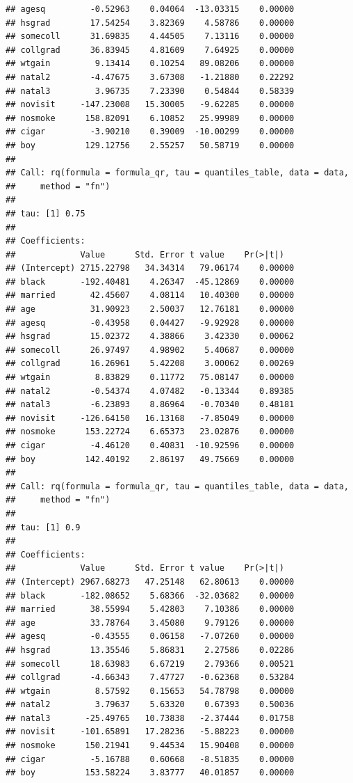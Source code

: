 \documentclass[]{book}
\begin{document}
\begin{verbatim}
## agesq         -0.52963    0.04064  -13.03315    0.00000
## hsgrad        17.54254    3.82369    4.58786    0.00000
## somecoll      31.69835    4.44505    7.13116    0.00000
## collgrad      36.83945    4.81609    7.64925    0.00000
## wtgain         9.13414    0.10254   89.08206    0.00000
## natal2        -4.47675    3.67308   -1.21880    0.22292
## natal3         3.96735    7.23390    0.54844    0.58339
## novisit     -147.23008   15.30005   -9.62285    0.00000
## nosmoke      158.82091    6.10852   25.99989    0.00000
## cigar         -3.90210    0.39009  -10.00299    0.00000
## boy          129.12756    2.55257   50.58719    0.00000
##
## Call: rq(formula = formula_qr, tau = quantiles_table, data = data,
##     method = "fn")
##
## tau: [1] 0.75
##
## Coefficients:
##             Value      Std. Error t value    Pr(>|t|)
## (Intercept) 2715.22798   34.34314   79.06174    0.00000
## black       -192.40481    4.26347  -45.12869    0.00000
## married       42.45607    4.08114   10.40300    0.00000
## age           31.90923    2.50037   12.76181    0.00000
## agesq         -0.43958    0.04427   -9.92928    0.00000
## hsgrad        15.02372    4.38866    3.42330    0.00062
## somecoll      26.97497    4.98902    5.40687    0.00000
## collgrad      16.26961    5.42208    3.00062    0.00269
## wtgain         8.83829    0.11772   75.08147    0.00000
## natal2        -0.54374    4.07482   -0.13344    0.89385
## natal3        -6.23893    8.86964   -0.70340    0.48181
## novisit     -126.64150   16.13168   -7.85049    0.00000
## nosmoke      153.22724    6.65373   23.02876    0.00000
## cigar         -4.46120    0.40831  -10.92596    0.00000
## boy          142.40192    2.86197   49.75669    0.00000
##
## Call: rq(formula = formula_qr, tau = quantiles_table, data = data,
##     method = "fn")
##
## tau: [1] 0.9
##
## Coefficients:
##             Value      Std. Error t value    Pr(>|t|)
## (Intercept) 2967.68273   47.25148   62.80613    0.00000
## black       -182.08652    5.68366  -32.03682    0.00000
## married       38.55994    5.42803    7.10386    0.00000
## age           33.78764    3.45080    9.79126    0.00000
## agesq         -0.43555    0.06158   -7.07260    0.00000
## hsgrad        13.35546    5.86831    2.27586    0.02286
## somecoll      18.63983    6.67219    2.79366    0.00521
## collgrad      -4.66343    7.47727   -0.62368    0.53284
## wtgain         8.57592    0.15653   54.78798    0.00000
## natal2         3.79637    5.63320    0.67393    0.50036
## natal3       -25.49765   10.73838   -2.37444    0.01758
## novisit     -101.65891   17.28236   -5.88223    0.00000
## nosmoke      150.21941    9.44534   15.90408    0.00000
## cigar         -5.16788    0.60668   -8.51835    0.00000
## boy          153.58224    3.83777   40.01857    0.00000
\end{verbatim}
\end{document}

